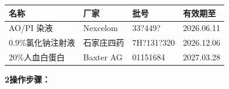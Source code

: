 \documentclass[UTF8,10pt,a4paper,fontset=fandol]{ctexart}
\newcommand{\fieldvalue}[1]{#1}
\newcommand{\handwritten}[1]{#1}
\begin{document}
\begin{center}
\small
\begin{tabularx}{\textwidth}{|X|X|X|X|}
\hline
名称 & 厂家 & 批号 & 有效期至\\
\hline
\fieldvalue{AO/PI 染液} &
\fieldvalue{Nexcelom} &
\fieldvalue{\handwritten{33?449?}} &
\fieldvalue{\handwritten{2026.06.11}}\\
\hline
\fieldvalue{0.9\%氯化钠注射液} &
\fieldvalue{石家庄四药} &
\fieldvalue{\handwritten{7H?131?320}} &
\fieldvalue{\handwritten{2026.12.06}}\\
\hline
\fieldvalue{20\%人血白蛋白} &
\fieldvalue{Baxter AG} &
\fieldvalue{\handwritten{01151684}} &
\fieldvalue{\handwritten{2027.03.28}}\\
\hline
\end{tabularx}
\end{center}

\noindent\textbf{2\quad 操作步骤：}
\end{document}
